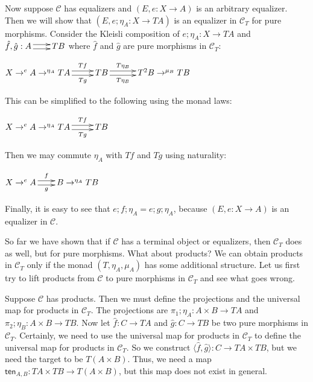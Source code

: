 \documentclass{article}
\let\mto\to
\let\to\relax
\newcommand{\to}{\rightarrow}
\newcommand{\cat}[1]{\mathcal{#1}}
\begin{document}
Now suppose $\cat{C}$ has equalizers and $(E, e : X \mto A)$ is an
arbitrary equalizer.  Then we will show that $(E, e;\eta_A : X \mto
TA)$ is an equalizer in $\cat{C}_T$ for pure morphisms.  Consider the
Kleisli composition of $e;\eta_A : X \mto TA$ and $\hat{f},\hat{g} : A
\two TB$ where $\hat{f}$ and $\hat{g}$ are pure morphisms in
$\cat{C}_T$:
\begin{center}
  \begin{math}
    X \mto^{e} A \mto^{\eta_A} TA \two^{Tf}_{Tg} TB \two^{T\eta_B}_{T\eta_B} T^2B \mto^{\mu_B} TB
  \end{math}
\end{center}
This can be simplified to the following using the monad laws:
\begin{center}
  \begin{math}
    X \mto^{e} A \mto^{\eta_A} TA \two^{Tf}_{Tg} TB
  \end{math}
\end{center}
Then we may commute $\eta_A$ with $Tf$ and $Tg$ using naturality:
\begin{center}
  \begin{math}
    X \mto^{e} A \two^{f}_{g} B \mto^{\eta_A} TB
  \end{math}
\end{center}
Finally, it is easy to see that $e;f;\eta_A = e;g;\eta_A$, because
$(E, e : X \mto A)$ is an equalizer in $\cat{C}$.

So far we have shown that if $\cat{C}$ has a terminal object or
equalizers, then $\cat{C}_T$ does as well, but for pure morphisms.
What about products?  We can obtain products in $\cat{C}_T$ only if
the monad $(T,\eta_A, \mu_A)$ has some additional structure.  Let us
first try to lift products from $\cat{C}$ to pure morphisms in
$\cat{C}_T$ and see what goes wrong.

Suppose $\cat{C}$ has products.  Then we must define the projections
and the universal map for products in $\cat{C}_T$.  The projections
are $\pi_1;\eta_A : A \times B \mto TA$ and $\pi_2;\eta_B : A \times B
\mto TB$.  Now let $\hat{f} : C \mto TA$ and $\hat{g} : C \mto TB$ be
two pure morphisms in $\cat{C}_T$.  Certainly, we need to use the
universal map for products in $\cat{C}_T$ to define the universal map
for products in $\cat{C}_T$.  So we construct $\langle \hat{f},
\hat{g} \rangle : C \mto TA \times TB$, but we need the target to be
$T(A \times B)$.  Thus, we need a map $\mathsf{ten}_{A,B} : TA \times
TB \mto T(A \times B)$, but this map does not exist in general.
\end{document}
